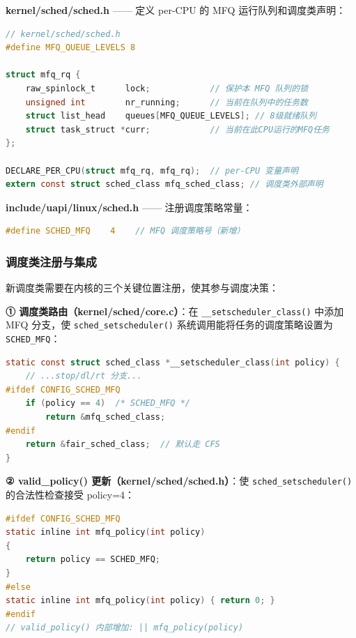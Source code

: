 \documentclass[a4paper]{article}
\begin{document}
\textbf{kernel/sched/sched.h} —— 定义 per-CPU 的 MFQ 运行队列和调度类声明：

\begin{lstlisting}[language=C, caption={mfq\_rq 结构和调度类声明（kernel/sched/sched.h）}, label={lst:mfq_rq}]
// kernel/sched/sched.h
#define MFQ_QUEUE_LEVELS 8

struct mfq_rq {
    raw_spinlock_t      lock;            // 保护本 MFQ 队列的锁
    unsigned int        nr_running;      // 当前在队列中的任务数
    struct list_head    queues[MFQ_QUEUE_LEVELS]; // 8级就绪队列
    struct task_struct *curr;            // 当前在此CPU运行的MFQ任务
};

DECLARE_PER_CPU(struct mfq_rq, mfq_rq);  // per-CPU 变量声明
extern const struct sched_class mfq_sched_class; // 调度类外部声明
\end{lstlisting}

\textbf{include/uapi/linux/sched.h} —— 注册调度策略常量：

\begin{lstlisting}[language=C, caption={SCHED\_MFQ 策略注册（include/uapi/linux/sched.h）}, label={lst:mfq_policy}]
#define SCHED_MFQ    4    // MFQ 调度策略号（新增）
\end{lstlisting}

\subsubsection{调度类注册与集成}

新调度类需要在内核的三个关键位置注册，使其参与调度决策：

\textbf{① 调度类路由（kernel/sched/core.c）}：在 \texttt{\_\_setscheduler\_class()} 中添加 MFQ 分支，使 \texttt{sched\_setscheduler()} 系统调用能将任务的调度策略设置为 \texttt{SCHED\_MFQ}：

\begin{lstlisting}[language=C, caption={调度类路由 — \_\_setscheduler\_class（kernel/sched/core.c）}, label={lst:mfq_core}]
static const struct sched_class *__setscheduler_class(int policy) {
    // ...stop/dl/rt 分支...
#ifdef CONFIG_SCHED_MFQ
    if (policy == 4)  /* SCHED_MFQ */
        return &mfq_sched_class;
#endif
    return &fair_sched_class;  // 默认走 CFS
}
\end{lstlisting}

\textbf{② valid\_policy() 更新（kernel/sched/sched.h）}：使 \texttt{sched\_setscheduler()} 的合法性检查接受 policy=4：

\begin{lstlisting}[language=C, caption={valid\_policy 与 mfq\_policy 辅助函数（kernel/sched/sched.h）}, label={lst:mfq_valid}]
#ifdef CONFIG_SCHED_MFQ
static inline int mfq_policy(int policy)
{
    return policy == SCHED_MFQ;
}
#else
static inline int mfq_policy(int policy) { return 0; }
#endif
// valid_policy() 内部增加: || mfq_policy(policy)
\end{lstlisting}
\end{document}
